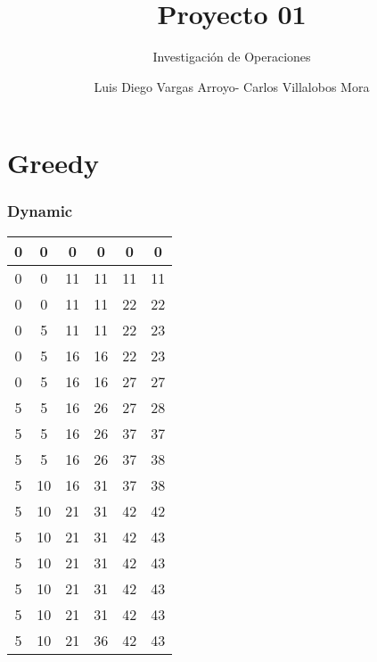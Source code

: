 \documentclass[12]{beamer}
\title{Proyecto 01}
\subtitle{Investigación de Operaciones}
\author{Luis Diego Vargas Arroyo- Carlos Villalobos Mora}
\begin{document}
\frame{\titlepage}
\section{Greedy}
\begin{frame}
\frametitle{Dynamic}

\begin{center}
\begin{adjustbox}{max width=\textwidth}
\begin{tabular}{ |c|c|c|c|c|c|}
\hline
 0 & 0 & 0 & 0 & 0 & 0 \\ 
\hline
 0 & 0 & 11 & 11 & 11 & 11 \\ 
\hline
 0 & 0 & 11 & 11 & 22 & 22 \\ 
\hline
 0 & 5 & 11 & 11 & 22 & 23 \\ 
\hline
 0 & 5 & 16 & 16 & 22 & 23 \\ 
\hline
 0 & 5 & 16 & 16 & 27 & 27 \\ 
\hline
 5 & 5 & 16 & 26 & 27 & 28 \\ 
\hline
 5 & 5 & 16 & 26 & 37 & 37 \\ 
\hline
 5 & 5 & 16 & 26 & 37 & 38 \\ 
\hline
 5 & 10 & 16 & 31 & 37 & 38 \\ 
\hline
 5 & 10 & 21 & 31 & 42 & 42 \\ 
\hline
 5 & 10 & 21 & 31 & 42 & 43 \\ 
\hline
 5 & 10 & 21 & 31 & 42 & 43 \\ 
\hline
 5 & 10 & 21 & 31 & 42 & 43 \\ 
\hline
 5 & 10 & 21 & 31 & 42 & 43 \\ 
\hline
 5 & 10 & 21 & 36 & 42 & 43 \\ 
\hline
\end{tabular}
\end{adjustbox}
\end{center}

\end{frame}
\end{document}
